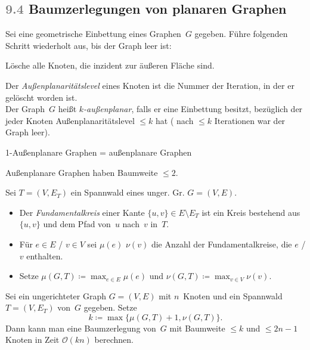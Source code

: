 \documentclass{cheat-sheet}
\renewcommand{\O}{\mathcal{O}} %
\newcommand{\scriptSection}[1]{\textcolor{gray}{#1}\enspace}
\begin{document}

\subsection{\scriptSection{9.4} Baumzerlegungen von planaren Graphen}

\begin{defn}
  Sei eine geometrische Einbettung eines Graphen~$G$ gegeben.
  Führe folgenden Schritt wiederholt aus, bis der Graph leer ist:

  \hfill\begin{minipage}{0.95 \linewidth}
    Lösche alle Knoten, die inzident zur äußeren Fläche sind.
  \end{minipage}

  Der \textit{Außenplanaritätslevel} eines Knoten ist die Nummer der Iteration, in der er gelöscht worden ist. \\
  Der Graph~$G$ heißt \emph{$k$-außenplanar}, falls er eine Einbettung besitzt, bezüglich der jeder Knoten Außenplanaritätslevel $\leq k$ hat (\dh{} nach $\leq k$ Iterationen war der Graph leer).
\end{defn}

\begin{bem}
  1-Außenplanare Graphen = außenplanare Graphen
\end{bem}

\begin{lem}
  Außenplanare Graphen haben Baumweite $\leq 2$.
\end{lem}

\begin{defn}
  Sei $T \!=\! (V, E_T)$ ein Spannwald eines unger. Gr. $G \!=\! (V, E)$.
  \begin{itemize}
    \item Der \emph{Fundamentalkreis} einer Kante $\{ u, v \} \in E \setminus E_T$ ist ein Kreis bestehend aus $\{ u, v \}$ und dem Pfad von~$u$ nach~$v$ in~$T$.
    \item Für $e \in E$ / $v \in V$ sei $\mu(e)$ $\nu(v)$ die Anzahl der Fundamentalkreise, die $e$ / $v$ enthalten.
    \item Setze $\mu(G, T) \coloneqq {\max}_{e \in E} \mu(e)$ und $\nu(G, T) \coloneqq {\max}_{v \in V} \nu(v)$.
  \end{itemize}
\end{defn}

\begin{lem}
  Sei ein ungerichteter Graph $G = (V, E)$ mit $n$~Knoten und ein Spannwald $T = (V, E_T)$ von~$G$ gegeben.
  Setze
  \[ k \coloneqq \max \{ \mu(G, T) + 1, \nu(G, T) \}. \]
  Dann kann man eine Baumzerlegung von~$G$ mit Baumweite $\leq k$ und $\leq 2n - 1$ Knoten in Zeit $\O(k n)$ berechnen.
\end{lem}
\end{document}
